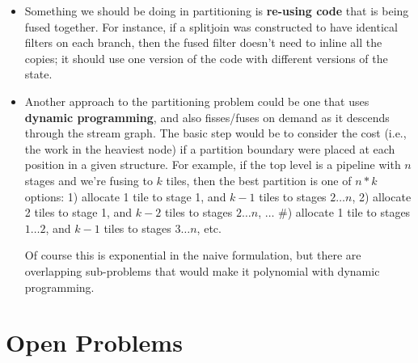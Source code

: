 \documentclass[12pt]{article}
\begin{document}
  \begin{itemize}

    \item Something we should be doing in partitioning is {\bf
    re-using code} that is being fused together.  For instance, if a
    splitjoin was constructed to have identical filters on each
    branch, then the fused filter doesn't need to inline all the
    copies; it should use one version of the code with different
    versions of the state.

    \item Another approach to the partitioning problem could be one
    that uses {\bf dynamic programming}, and also fisses/fuses on
    demand as it descends through the stream graph.  The basic step
    would be to consider the cost (i.e., the work in the heaviest
    node) if a partition boundary were placed at each position in a
    given structure.  For example, if the top level is a pipeline with
    $n$ stages and we're fusing to $k$ tiles, then the best partition
    is one of $n*k$ options: 1) allocate 1 tile to stage 1, and $k-1$
    tiles to stages $2 \dots n$, 2) allocate 2 tiles to stage 1, and
    $k-2$ tiles to stages $2 \dots n$, $\dots$ \#) allocate 1 tile to
    stages $1 \dots 2$, and $k-1$ tiles to stages $3 \dots n$, etc.

    Of course this is exponential in the naive formulation, but there
    are overlapping sub-problems that would make it polynomial with
    dynamic programming.

  \end{itemize}

  \section{Open Problems}
\end{document}
